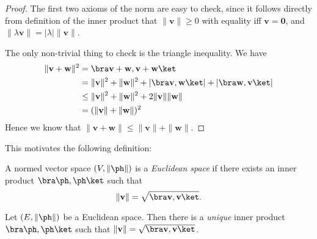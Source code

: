 \documentclass[a4paper]{article}
\begin{document}
\begin{proof}
  The first two axioms of the norm are easy to check, since it follows directly from definition of the inner product that $\|\mathbf{v}\| \geq 0$ with equality iff $\mathbf{v} = \mathbf{0}$, and $\|\lambda \mathbf{v}\| = |\lambda| \|\mathbf{v}\|$.

  The only non-trivial thing to check is the triangle inequality. We have
  \begin{align*}
    \|\mathbf{v} + \mathbf{w}\|^2 &= \bra \mathbf{v} + \mathbf{w}, \mathbf{v} + \mathbf{w}\ket\\
    &= \|\mathbf{v}\|^2 + \|\mathbf{w}\|^2 + |\bra \mathbf{v}, \mathbf{w}\ket| + |\bra \mathbf{w}, \mathbf{v}\ket|\\
    &\leq \|\mathbf{v}\|^2 + \|\mathbf{w}\|^2 + 2\|\mathbf{v}\|\|\mathbf{w}\| \\
    &= (\|\mathbf{v}\| + \|\mathbf{w}\|)^2
  \end{align*}
  Hence we know that $\|\mathbf{v} + \mathbf{w}\| \leq \|\mathbf{v} \| + \|\mathbf{w}\|$.
\end{proof}

This motivates the following definition:
\begin{defi}
  A normed vector space $(V, \|\ph\|)$ is a \emph{Euclidean space} if there exists an inner product $\bra \ph,\ph\ket$ such that
  \[
    \|\mathbf{v}\| = \sqrt{\bra \mathbf{v}, \mathbf{v}\ket}.
  \]
\end{defi}

\begin{prop}
  Let $(E, \|\ph\|)$ be a Euclidean space. Then there is a \emph{unique} inner product $\bra \ph,\ph\ket$ such that $\|\mathbf{v}\| = \sqrt{\bra \mathbf{v}, \mathbf{v}\ket}$.
\end{prop}
\end{document}
